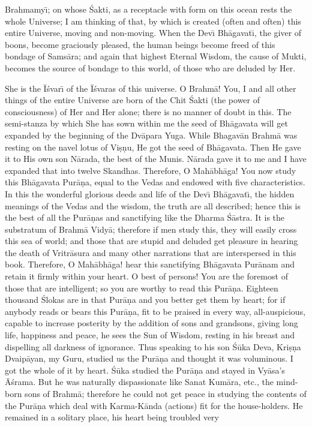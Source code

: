 Brahmamy\={\i}; on whose \'Sakti, as a receptacle with form on this ocean rests the whole Universe; I am thinking of that, by which is created (often and often) this entire Universe, moving and non-moving. When the Dev\={\i} Bh\=agavat\={\i}, the giver of boons, become graciously pleased, the human beings become freed of this bondage of Sams\=ara; and again that highest Eternal Wisdom, the cause of Mukti, becomes the source of bondage to this world, of those who are deluded by Her.

She is the \=I\'svar\={\i} of the \=I\'svaras of this universe. O Brahm\=a! You, I and all other things of the entire Universe are born of the Chit \'Sakti (the power of consciousness) of Her and Her alone; there is no manner of doubt in this. The semi-stanza by which She has sown within me the seed of Bh\=agavata will get expanded by the beginning of the Dv\=apara Yuga. While Bhagav\=an Brahm\=a was resting on the navel lotus of Vi\d{s}\d{n}u, He got the seed of Bh\=agavata. Then He gave it to His own son N\=arada, the best of the Munis. N\=arada gave it to me and I have expanded that into twelve Skandhas. Therefore, O Mah\=abh\=aga! You now study this Bh\=agavata Pur\=a\d{n}a, equal to the Vedas and endowed with five characteristics. In this the wonderful glorious deeds and life of the Dev\={\i} Bh\=agavat\={\i}, the hidden meanings of the Vedas and the wisdom, the truth are all described; hence this is the best of all the Pur\=a\d{n}as and sanctifying like the Dharma \'S\=astra. It is the substratum of Brahm\=a Vidy\=a; therefore if men study this, they will easily cross this sea of world; and those that are stupid and deluded get pleasure in hearing the death of Vritr\=asura and many other narrations that are interspersed
in this book. Therefore, O Mah\=abh\=aga! hear this sanctifying Bh\=agavata Pur\=anam and retain it firmly within your heart. O best of persons! You are the foremost of those that are intelligent; so you are worthy to read this Pur\=a\d{n}a. Eighteen thousand \'Slokas are in that Pur\=a\d{n}a and you better get them by heart; for if anybody reads or bears this Pur\=a\d{n}a, fit to be praised in every way, all-auspicious, capable to increase posterity by the addition of sons and grandsons, giving long life, happiness and peace, he sees the Sun of Wisdom, resting in his breast and dispelling all darkness of ignorance. Thus speaking to his son \'S\=uka Deva, Kri\d{s}\d{n}a Dvaip\=ayan, my Guru, studied us the Pur\=a\d{n}a and thought it was voluminous. I got the whole of it by heart. \'S\=uka studied the Pur\=a\d{n}a and stayed in Vy\=asa's \=A\'srama. But he was naturally dispassionate like Sanat Kum\=ara, etc., the mind-born sons of Brahm\=a; therefore he could not get peace in studying the contents of the Pur\=a\d{n}a which deal with Karma-K\=anda (actions) fit for the house-holders. He remained in a solitary place, his heart being troubled very

